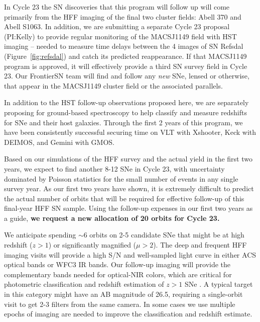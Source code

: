 \documentclass[12pt]{article}
\begin{document}

%
%
\describeobservations   %

In Cycle 23 the SN discoveries that this program will follow up will
come primarily from the HFF imaging of the final two cluster fields:
Abell 370 and Abell S1063. In addition, we are submitting a separate
Cycle 23 proposal (PI:Kelly) to provide regular monitoring of the
MACSJ1149 field with HST imaging -- needed to
measure time delays between the 4 images of SN Refsdal
(Figure~\ref{fig:refsdal}) and catch its predicted reappearance.  If
that MACSJ1149 program is approved, it will effectively provide a
third SN survey field in Cycle 23. Our FrontierSN team will find
and follow any {\it new} SNe, lensed or otherwise, that appear in the
MACSJ1149 cluster field or the associated parallels.  

In addition to the HST follow-up observations proposed here, we are
separately proposing for ground-based spectroscopy to help classify
and measure redshifts for SNe and their host galaxies. Through the
first 2 years of this program, we have been consistently successful
securing time on VLT with Xshooter, Keck with DEIMOS, and Gemini with
GMOS.

Based on our simulations of the HFF survey and the actual yield in the
first two years, we expect to find another 8-12 SNe in Cycle 23, with
uncertainty dominated by Poisson statistics for the small number of
events in any single survey year.  As our first two years have shown,
it is extremely difficult to predict the actual number of orbits
that will be required for effective follow-up of this final-year HFF
SN sample.  Using the follow-up expenses in our first two years as a
guide, {\bf we request a new allocation of 20 orbits for Cycle 23.}

We anticipate spending $\sim$6 orbits on 2-5 candidate SNe that might
be at high redshift ($z>1$) or significantly magnified ($\mu>2$).  The
deep and frequent HFF imaging visits will provide a high S/N and
well-sampled light curve in either ACS optical bands or WFC3 IR bands.
Our follow-up imaging will provide the complementary bands needed for
optical-NIR colors, which are critical for photometric classification
and redshift estimation of $z>1$ SNe \citep{Riess:2004a,Rodney:2012}.
A typical target in this category might have an AB magnitude of 26.5,
requiring a single-orbit visit to get 2-3 filters from the same
camera.  In some cases we use multiple epochs of imaging are needed
to improve the classification and redshift estimate.
\end{document}

